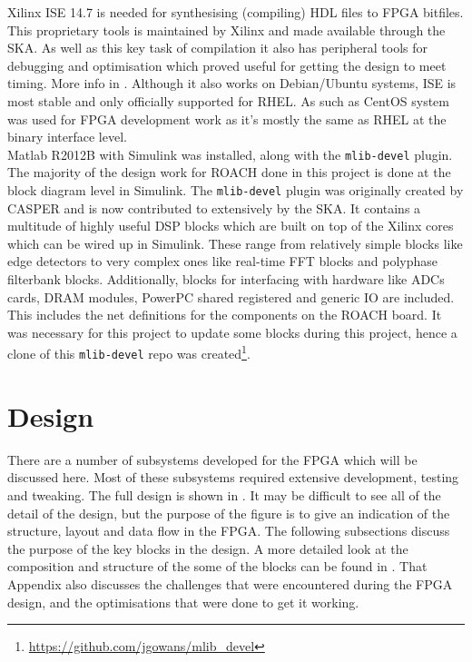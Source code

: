 Xilinx ISE 14.7 is needed for synthesising (compiling) HDL files to FPGA bitfiles. This proprietary tools is maintained by Xilinx and made available through the SKA. As well as this key task of compilation it also has peripheral tools for debugging and optimisation which proved useful for getting the design to meet timing. More info in . Although it also works on Debian/Ubuntu systems, ISE is most stable and only officially supported for RHEL. As such as CentOS system was used for FPGA development work as it's mostly the same as RHEL at the binary interface level.\\

Matlab R2012B with Simulink was installed, along  with the \lstinline{mlib-devel} plugin. The majority of the design work for ROACH done in this project is done at the block diagram level in Simulink. The \lstinline{mlib-devel} plugin was originally created by CASPER and is now contributed to extensively by the SKA. It contains a multitude of highly useful DSP blocks which are built on top of the Xilinx cores which can be wired up in Simulink. These range from relatively simple blocks like edge detectors to very complex ones like real-time FFT blocks and polyphase filterbank blocks. Additionally, blocks for interfacing with hardware like ADCs cards, DRAM modules, PowerPC shared registered and generic IO are included. This includes the net definitions for the components on the ROACH board. It was necessary for this project to update some blocks during this project, hence a clone of this \lstinline{mlib-devel} repo was created\footnote{\url{https://github.com/jgowans/mlib_devel}}.


\section{Design}
There are a number of subsystems developed for the FPGA which will be discussed here. Most of these subsystems required extensive development, testing and tweaking. The full design is shown in . It may be difficult to see all of the detail of the design, but the purpose of the figure is to give an indication of the structure, layout and data flow in the FPGA. The following subsections discuss the purpose of the key blocks in the design. A more detailed look at the composition and structure of the some of the blocks can be found in . That Appendix also discusses the challenges that were encountered during the FPGA design, and the optimisations that were done to get it working.

